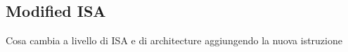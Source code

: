 \subsection{Modified ISA}
Cosa cambia a livello di ISA e di architecture aggiungendo la nuova istruzione